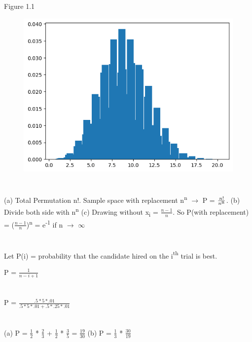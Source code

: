 \documentclass{report}
\begin{document}
{	\section{}
	Figure 1.1
	\begin{figure}
		\centering
		\includegraphics[width=0.7\linewidth]{screenshot001}
		\caption{}
		\label{fig:screenshot001}
	\end{figure}
	\section{}
	(a) Total Permutation n!. Sample space with replacement n{\textsuperscript{n}} {$\rightarrow$} P = {$\frac{n!}{n{\textsuperscript{n}}}$}. {\newline}
	(b) Divide both side with n{\textsuperscript{n}} {\newline}
	(c) Drawing without x{\textsubscript{i}} = {$\frac{n-1}{n}$}. So P(with replacement) = ({$\frac{n-1}{n}$}){\textsuperscript{n}} = e{\textsuperscript{-1}} if n {{$\rightarrow$}} {$\infty$}{\newline}
	{\newline}
	\section{}
	Let P(i) = probability that the candidate hired on the i{\textsuperscript{th}} trial is best.
	
	P = {$\frac{1}{n - i + 1}$} 
	{\newline}
	\section{}
	P = {$\frac{.5 * 5 * .01}{.5 * 5 * .01 + .5 * .25 * .01}$}
	\section{}
	(a) P = {$\frac{1}{2}$} * {$\frac{2}{3}$} + {$\frac{1}{2}$} * {$\frac{3}{5}$} = {$\frac{19}{30}$}
	{\newline}
	(b) P = {$\frac{1}{3}$} * {$\frac{30}{19}$}
}
\end{document}
